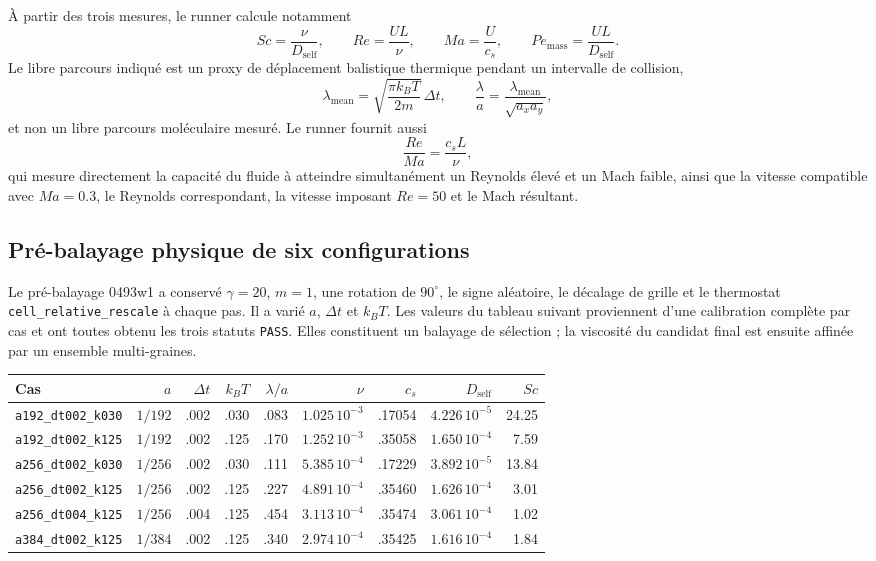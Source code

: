 \documentclass[11pt,a4paper]{article}
\begin{document}
À partir des trois mesures, le runner calcule notamment
\begin{equation}
  Sc=\frac{\nu}{D_{\mathrm{self}}},
  \qquad
  Re=\frac{UL}{\nu},
  \qquad
  Ma=\frac{U}{c_s},
  \qquad
  Pe_{\mathrm{mass}}=\frac{UL}{D_{\mathrm{self}}}.
\end{equation}
Le libre parcours indiqué est un proxy de déplacement balistique thermique pendant un intervalle de collision,
\begin{equation}
  \lambda_{\mathrm{mean}}=\sqrt{\frac{\pi k_BT}{2m}}\,\Delta t,
  \qquad
  \frac{\lambda}{a}=\frac{\lambda_{\mathrm{mean}}}{\sqrt{a_xa_y}},
\end{equation}
et non un libre parcours moléculaire mesuré. Le runner fournit aussi
\begin{equation}
  \frac{Re}{Ma}=\frac{c_sL}{\nu},
\end{equation}
qui mesure directement la capacité du fluide à atteindre simultanément un Reynolds élevé et un Mach faible, ainsi que la vitesse compatible avec $Ma=0.3$, le Reynolds correspondant, la vitesse imposant $Re=50$ et le Mach résultant.

\subsection{Pré-balayage physique de six configurations}

Le pré-balayage 0493w1 a conservé $\gamma=20$, $m=1$, une rotation de $90^\circ$, le signe aléatoire, le décalage de grille et le thermostat \texttt{cell\_relative\_rescale} à chaque pas. Il a varié $a$, $\Delta t$ et $k_BT$. Les valeurs du tableau suivant proviennent d'une calibration complète par cas et ont toutes obtenu les trois statuts \texttt{PASS}. Elles constituent un balayage de sélection ; la viscosité du candidat final est ensuite affinée par un ensemble multi-graines.

\begin{center}
\scriptsize
\begin{tabular}{lrrrrrrrr}
\toprule
Cas & $a$ & $\Delta t$ & $k_BT$ & $\lambda/a$ & $\nu$ & $c_s$ & $D_{\mathrm{self}}$ & $Sc$ \\
\midrule
\texttt{a192\_dt002\_k030} & $1/192$ & .002 & .030 & .083 & $1.025\,10^{-3}$ & .17054 & $4.226\,10^{-5}$ & 24.25 \\
\texttt{a192\_dt002\_k125} & $1/192$ & .002 & .125 & .170 & $1.252\,10^{-3}$ & .35058 & $1.650\,10^{-4}$ & 7.59 \\
\texttt{a256\_dt002\_k030} & $1/256$ & .002 & .030 & .111 & $5.385\,10^{-4}$ & .17229 & $3.892\,10^{-5}$ & 13.84 \\
\texttt{a256\_dt002\_k125} & $1/256$ & .002 & .125 & .227 & $4.891\,10^{-4}$ & .35460 & $1.626\,10^{-4}$ & 3.01 \\
\texttt{a256\_dt004\_k125} & $1/256$ & .004 & .125 & .454 & $3.113\,10^{-4}$ & .35474 & $3.061\,10^{-4}$ & 1.02 \\
\texttt{a384\_dt002\_k125} & $1/384$ & .002 & .125 & .340 & $2.974\,10^{-4}$ & .35425 & $1.616\,10^{-4}$ & 1.84 \\
\bottomrule
\end{tabular}
\end{center}
\end{document}
